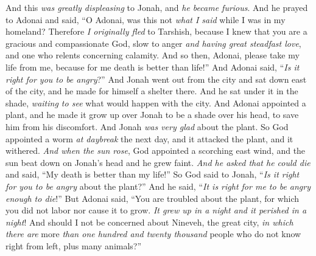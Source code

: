 \begin{biblechapter} %
 And this \textit{was greatly displeasing} to Jonah, and \textit{he became furious}.
\verse And he prayed to Adonai and said, “O Adonai, was this not \textit{what I said} while I was in my homeland? Therefore \textit{I originally fled} to Tarshish, because I knew that you are a gracious and compassionate God, slow to anger \textit{and having great steadfast love}, and one who relents concerning calamity.
\verse And so then, Adonai, please take my life from me, because for me death is better than life!”
\verse And Adonai said, “\textit{Is it right for you to be angry}?”
\verse And Jonah went out from the city and sat down east of the city, and he made for himself a shelter there. And he sat under it in the shade, \textit{waiting to see} what would happen with the city.
\verse And Adonai appointed a plant, and he made it grow up over Jonah to be a shade over his head, to save him from his discomfort. And Jonah \textit{was very glad} about the plant.
\verse So God appointed a worm \textit{at daybreak} the next day, and it attacked the plant, and it withered.
\verse \textit{And when the sun rose}, God appointed a scorching east wind, and the sun beat down on Jonah’s head and he grew faint. \textit{And he asked that he could die} and said, “My death is better than my life!”
\verse So God said to Jonah, “\textit{Is it right for you to be angry} about the plant?” And he said, “\textit{It is right for me to be angry enough to die}!”
\verse But Adonai said, “You are troubled about the plant, for which you did not labor nor cause it to grow. \textit{It grew up in a night and it perished in a night}!
\verse And should I not be concerned about Nineveh, the great city, \textit{in which there are} more \textit{than one hundred and twenty thousand} people who do not know right from left, plus many animals?”
\end{biblechapter}

